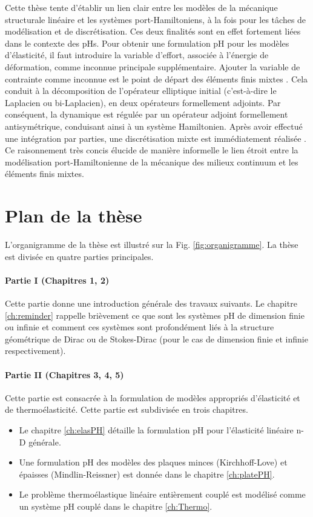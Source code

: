 Cette thèse tente d'établir un lien clair entre les modèles de la mécanique structurale linéaire et les systèmes port-Hamiltoniens, à la fois pour les tâches de modélisation et de discrétisation. Ces deux finalités sont en effet fortement liées dans le contexte des pHs. Pour obtenir une formulation pH pour les modèles d'élasticité, il faut introduire la variable d'effort, associée à l'énergie de déformation, comme inconnue principale supplémentaire. Ajouter la variable de contrainte comme inconnue est le point de départ des éléments finis mixtes \cite{arnold1990intro}. Cela conduit à la décomposition de l'opérateur elliptique initial (c'est-à-dire le Laplacien ou bi-Laplacien), en deux opérateurs formellement adjoints. Par conséquent, la dynamique est régulée par un opérateur adjoint formellement antisymétrique, conduisant ainsi à un système Hamiltonien. Après avoir effectué une intégration par parties, une discrétisation mixte est immédiatement réalisée \cite{joly2003variational}. Ce raisonnement très concis élucide de manière informelle le lien étroit entre la modélisation port-Hamiltonienne de la mécanique des milieux continuum et les éléments finis mixtes.

\section{Plan de la thèse}

L'organigramme de la thèse est illustré sur la Fig. \ref{fig:organigramme}. La thèse est divisée en quatre parties principales.

\paragraph{Partie I (Chapitres 1, 2)}
Cette partie donne une introduction générale des travaux suivants. Le chapitre \ref{ch:reminder} rappelle brièvement ce que sont les systèmes pH de dimension finie ou infinie et comment ces systèmes sont profondément liés à la structure géométrique de Dirac ou de Stokes-Dirac (pour le cas de dimension finie et infinie respectivement).

\paragraph{Partie II (Chapitres 3, 4, 5)}
Cette partie est consacrée à la formulation de modèles appropriés d'élasticité et de thermoélasticité. Cette partie est subdivisée en trois chapitres.
\begin{itemize}
\item Le chapitre \ref{ch:elasPH} détaille la formulation pH pour l'élasticité linéaire n-D générale.
\item Une formulation pH des modèles des plaques minces (Kirchhoff-Love) et épaisses (Mindlin-Reissner) est donnée dans le chapitre \ref{ch:platePH}.
\item Le problème thermoélastique linéaire entièrement couplé est modélisé comme un système pH couplé dans le chapitre \ref{ch:Thermo}.
\end{itemize}


